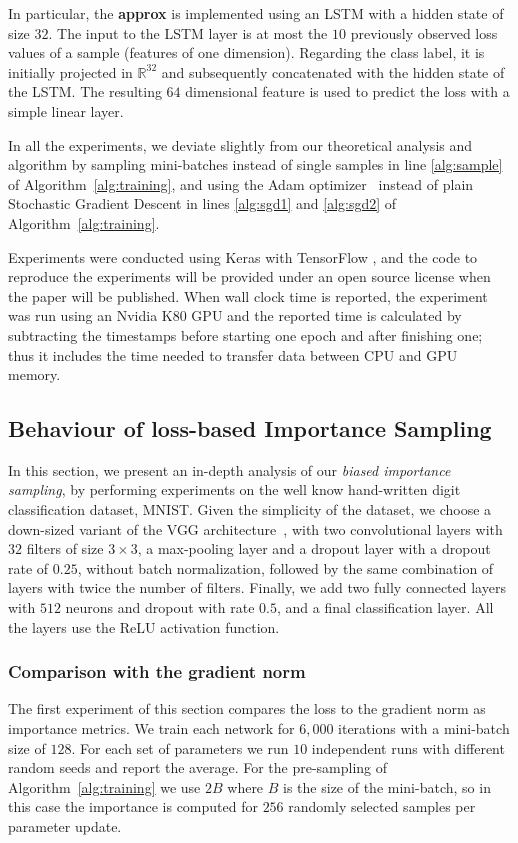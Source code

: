 \documentclass{article}
\begin{document}
In particular, the \textbf{approx} is implemented using an LSTM with a hidden
state of size $32$. The input to the LSTM layer is at most the $10$ previously
observed loss values of a sample (features of one dimension). Regarding the
class label, it is initially projected in $\mathbb{R}^{32}$ and subsequently
concatenated with the hidden state of the LSTM. The resulting $64$ dimensional
feature is used to predict the loss with a simple linear layer.

In all the experiments, we deviate slightly from our theoretical analysis and
algorithm by sampling mini-batches instead of single samples in line
\ref{alg:sample} of Algorithm~\ref{alg:training}, and using the Adam
optimizer~\cite{kingma2014adam} instead of plain Stochastic Gradient Descent in
lines \ref{alg:sgd1} and \ref{alg:sgd2} of Algorithm~\ref{alg:training}.

Experiments were conducted using Keras \cite{chollet2015} with TensorFlow
\cite{abadi2016tensorflow}, and the code to reproduce the experiments will be
provided under an open source license when the paper will be published. When
wall clock time is reported, the experiment was run using an Nvidia K80 GPU and
the reported time is calculated by subtracting the timestamps before starting one
epoch and after finishing one; thus it includes the time needed to transfer
data between CPU and GPU memory.

\subsection{Behaviour of loss-based Importance Sampling}

In this section, we present an in-depth analysis of our \emph{biased importance
sampling}, by performing experiments on the well know hand-written digit
classification dataset, MNIST. Given the simplicity of the dataset, we choose a
down-sized variant of the VGG architecture~\cite{simonyan14c}, with two
convolutional layers with $32$ filters of size $3\times3$, a max-pooling layer
and a dropout layer with a dropout rate of $0.25$, without batch normalization,
followed by the same combination of layers with twice the number of filters.
Finally, we add two fully connected layers with $512$ neurons and dropout with
rate $0.5$, and a final classification layer. All the layers use the ReLU
activation function.

\subsubsection{Comparison with the gradient norm} The first experiment of this
section compares the loss to the gradient norm as importance metrics. We train
each network for $6,000$ iterations with a mini-batch size of $128$. For each
set of parameters we run $10$ independent runs with different random seeds and
report the average. For the pre-sampling of Algorithm~\ref{alg:training} we use
$2 B$ where $B$ is the size of the mini-batch, so in this case the importance
is computed for $256$ randomly selected samples per parameter update.
\end{document}
